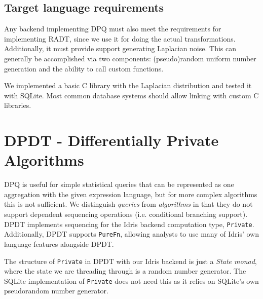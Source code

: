 \documentclass[12pt]{report}
\begin{document}
\section{Target language requirements}\label{sec:DPQ_requirements}

Any backend implementing DPQ must also meet the requirements for implementing RADT, since we use it for doing the actual transformations.
Additionally, it must provide support generating Laplacian noise.
This can generally be accomplished via two components: (pseudo)random uniform number generation and the ability to call custom functions.

We implemented a basic C library with the Laplacian distribution and tested it with SQLite.
Most common database systems should allow linking with custom C libraries.

\chapter{DPDT - Differentially Private Algorithms}\label{sec:DPDT}

DPQ is useful for simple statistical queries that can be represented as one aggregation with the given expression language, but for more complex algorithms this is not sufficient.
We distinguish \textit{queries} from \textit{algorithms} in that they do not support dependent sequencing operations (i.e. conditional branching support).
DPDT implements sequencing for the Idris backend computation type, \texttt{Private}.
Additionally, DPDT supports \texttt{PureFn}, allowing analysts to use many of Idris' own language features alongside DPDT.

The structure of \texttt{Private} in DPDT with our Idris backend is just a \textit{State monad}, where the state we are threading through is a random number generator.
The SQLite implementation of \texttt{Private} does not need this as it relies on SQLite's own pseudorandom number generator.
\end{document}
